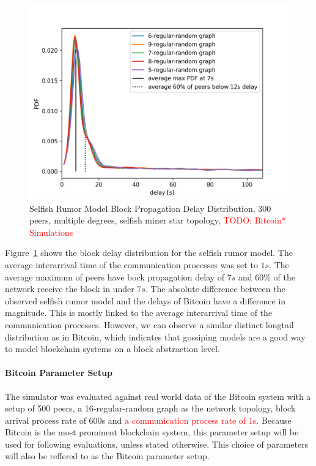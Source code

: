 \begin{figure}[h]
	\includegraphics[width=\textwidth]{figures/propagation_multi_degree_300_peers.png}
	\caption{Selfish Rumor Model Block Propagation Delay Distribution, 300 peers, multiple degrees, selfish miner star topology, \textcolor{red}{TODO: Bitcoin* Simulations }}
	\label{fig:SRMblockprop}
\end{figure}
Figure~\ref{fig:SRMblockprop} shows the block delay distribution for the selfish rumor model. The average interarrival time of the communication processes was set to $1s$. The average maximum of peers have bock propagation delay of $7s$ and $60\% $ of the network receive the block in under $7s$. The absolute difference between the observed selfish rumor model and the delays of Bitcoin have a difference in magnitude. This is mostly linked to the average interarrival time of the communication processes. However, we can observe a similar distinct longtail distribution as in Bitcoin, which indicates that gossiping models are a good way to model blockchain systems on a block abstraction level.

\paragraph{Bitcoin Parameter Setup}
The simulator was evaluated against real world data of the Bitcoin system with a setup of 500 peers, a 16-regular-random graph as the network topology, block arrival process rate of 600s and \textcolor{red}{a communication process rate of 1s}. Because Bitcoin is the most prominent blockchain system, this parameter setup will be used for following evaluations, unless stated otherwise. This choice of parameters will also be reffered to as the Bitcoin parameter setup.	

